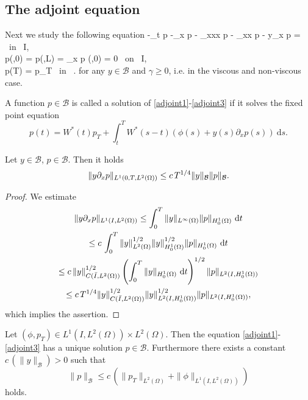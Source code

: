\subsection{The adjoint equation}
\label{appendixadjoint}
Next we study the following equation
\besn
-\partial_t p -\partial_x p - \partial_{xxx} p - \gamma \partial_{xx} p  - y\partial_x p =  \phi \mbox{ in } I\times\Omega,\label{adjoint1}\\
p(\cdot,0) = p(\cdot,L) = \partial_x p (\cdot,0) = 0 \mbox{ on } I,\label{adjoint2}\\
p(T) = p_{T} \mbox{ in } \Omega.\label{adjoint3}
\eesn
for any $y\in \mathcal B$ {\color{red} and $\gamma\geq0$, i.e. in the viscous and non-viscous case.}
\begin{definition}
A function $p\in \mathcal B$ is called a solution of \eqref{adjoint1}-\eqref{adjoint3} if it solves the fixed point equation
\[
p(t)=W^*(t)p_T+\int_t^TW^*(s-t)(\phi(s)+y(s)\partial_x p(s))~\mathrm ds.
\]
\end{definition}
\begin{lemma}\label{lemadjoint}
  Let $y\in\mathcal B$, $p\in\mathcal B$. Then it holds
\[
\lVert y\partial_x p\rVert_{L^1(0,T,L^2(\Omega))} \leq c\,T^{1/4}\lVert y\rVert_{\mathcal{B}}\lVert p\rVert_{\mathcal{B}}.
\]
\end{lemma}
\begin{proof}
We estimate
\begin{multline*}
\lVert y\partial_x p\rVert_{L^1(I,L^2(\Omega))}\leq \int_0^T{\lVert y\rVert_{L^{\infty}(\Omega)}\lVert p\rVert_{H^1_0(\Omega)}}~\mathrm dt\\
\leq c\,\int_0^T{\lVert y\rVert_{L^2(\Omega)}^{1/2}\lVert y\rVert_{H^1_0(\Omega)}^{1/2}\lVert p\rVert_{H^1_0(\Omega)}}~\mathrm dt\\
\leq c\,\lVert y\rVert_{C(\bar I,L^2(\Omega))}^{1/2}\left( \int_0^T{\lVert y\rVert_{H^1_0(\Omega)}}~\mathrm dt\right)^{1/2}\lVert p\rVert_{L^2(I,H^1_0(\Omega))}\\
\leq c\, T^{1/4} \lVert y\rVert_{C(\bar I,L^2(\Omega))}^{1/2} \lVert y\rVert_{L^2(I,H^1_0(\Omega))}^{1/2}\lVert p\rVert_{L^2(I,H^1_0(\Omega))},
\end{multline*}
which implies the assertion.
\qquad\end{proof}
\begin{proposition}
Let $(\phi,p_T)\in L^1(I,L^2(\Omega))\times L^2(\Omega)$. Then the equation \eqref{adjoint1}-\eqref{adjoint3} has a unique solution $p\in \mathcal B$. Furthermore there exists a constant $c\,(\|y\|_{\mathcal B})>0$ such that
\begin{equation}\label{apriori_adjoint}
\|p\|_{\mathcal B}\leq c\,(\|p_T\|_{L^2(\Omega)}+\|\phi\|_{L^1(I,L^2(\Omega))})
\end{equation}
holds.
\end{proposition}
